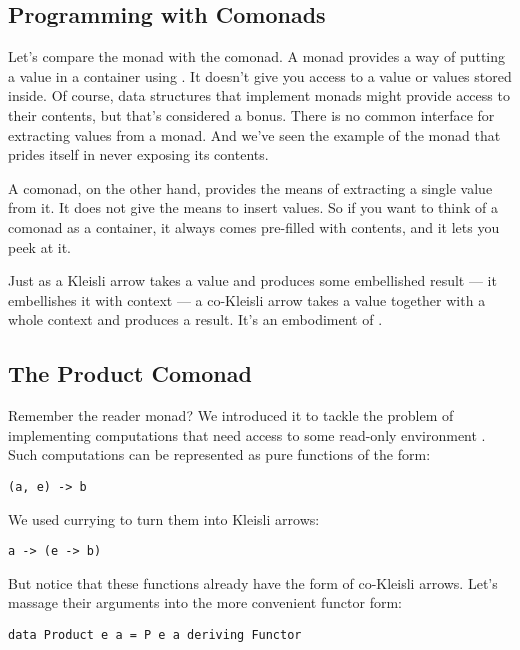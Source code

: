 \subsection{Programming with Comonads}\label{programming-with-comonads}

Let's compare the monad with the comonad. A monad provides a way of
putting a value in a container using . It doesn't give
you access to a value or values stored inside. Of course, data
structures that implement monads might provide access to their contents,
but that's considered a bonus. There is no common interface for
extracting values from a monad. And we've seen the example of the
 monad that prides itself in never exposing its contents.

A comonad, on the other hand, provides the means of extracting a single
value from it. It does not give the means to insert values. So if you
want to think of a comonad as a container, it always comes pre-filled
with contents, and it lets you peek at it.

Just as a Kleisli arrow takes a value and produces some embellished
result --- it embellishes it with context --- a co-Kleisli arrow takes a
value together with a whole context and produces a result. It's an
embodiment of .

\subsection{The Product Comonad}\label{the-product-comonad}

Remember the reader monad? We introduced it to tackle the problem of
implementing computations that need access to some read-only environment
. Such computations can be represented as pure functions of
the form:

\begin{verbatim}
(a, e) -> b
\end{verbatim}

We used currying to turn them into Kleisli arrows:

\begin{verbatim}
a -> (e -> b)
\end{verbatim}

But notice that these functions already have the form of co-Kleisli
arrows. Let's massage their arguments into the more convenient functor
form:

\begin{verbatim}
data Product e a = P e a deriving Functor
\end{verbatim}

